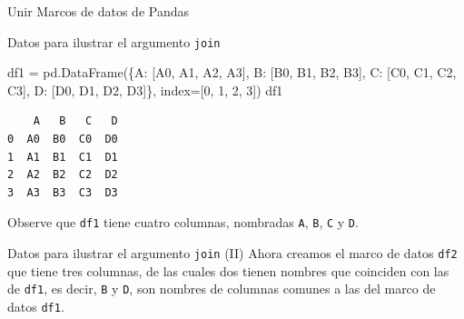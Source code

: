 \documentclass[
  ignorenonframetext,
  aspectratio=169,
  spanish,
]{beamer}
\newenvironment{Shaded}{\begin{snugshade}}{\end{snugshade}}
\newcommand{\DecValTok}[1]{\textcolor[rgb]{0.68,0.00,0.00}{#1}}
\newcommand{\NormalTok}[1]{\textcolor[rgb]{0.00,0.23,0.31}{#1}}
\newcommand{\OperatorTok}[1]{\textcolor[rgb]{0.37,0.37,0.37}{#1}}
\newcommand{\StringTok}[1]{\textcolor[rgb]{0.13,0.47,0.30}{#1}}
\begin{document}
\begin{frame}[fragile]{Unir Marcos de datos de Pandas}
\begin{block}{Datos para ilustrar el argumento \texttt{join}}
\label{datos-para-ilustrar-el-argumento-join}
\begin{Shaded}
\begin{Highlighting}[]
\NormalTok{df1 }\OperatorTok{=}\NormalTok{ pd.DataFrame(\{}\StringTok{\textquotesingle{}A\textquotesingle{}}\NormalTok{: [}\StringTok{\textquotesingle{}A0\textquotesingle{}}\NormalTok{, }\StringTok{\textquotesingle{}A1\textquotesingle{}}\NormalTok{, }\StringTok{\textquotesingle{}A2\textquotesingle{}}\NormalTok{, }\StringTok{\textquotesingle{}A3\textquotesingle{}}\NormalTok{],}
                    \StringTok{\textquotesingle{}B\textquotesingle{}}\NormalTok{: [}\StringTok{\textquotesingle{}B0\textquotesingle{}}\NormalTok{, }\StringTok{\textquotesingle{}B1\textquotesingle{}}\NormalTok{, }\StringTok{\textquotesingle{}B2\textquotesingle{}}\NormalTok{, }\StringTok{\textquotesingle{}B3\textquotesingle{}}\NormalTok{],}
                    \StringTok{\textquotesingle{}C\textquotesingle{}}\NormalTok{: [}\StringTok{\textquotesingle{}C0\textquotesingle{}}\NormalTok{, }\StringTok{\textquotesingle{}C1\textquotesingle{}}\NormalTok{, }\StringTok{\textquotesingle{}C2\textquotesingle{}}\NormalTok{, }\StringTok{\textquotesingle{}C3\textquotesingle{}}\NormalTok{],}
                    \StringTok{\textquotesingle{}D\textquotesingle{}}\NormalTok{: [}\StringTok{\textquotesingle{}D0\textquotesingle{}}\NormalTok{, }\StringTok{\textquotesingle{}D1\textquotesingle{}}\NormalTok{, }\StringTok{\textquotesingle{}D2\textquotesingle{}}\NormalTok{, }\StringTok{\textquotesingle{}D3\textquotesingle{}}\NormalTok{]\},}
\NormalTok{                       index}\OperatorTok{=}\NormalTok{[}\DecValTok{0}\NormalTok{, }\DecValTok{1}\NormalTok{, }\DecValTok{2}\NormalTok{, }\DecValTok{3}\NormalTok{])}
\NormalTok{df1}
\end{Highlighting}
\end{Shaded}

\begin{verbatim}
    A   B   C   D
0  A0  B0  C0  D0
1  A1  B1  C1  D1
2  A2  B2  C2  D2
3  A3  B3  C3  D3
\end{verbatim}

Observe que \texttt{df1} tiene cuatro columnas, nombradas \texttt{A},
\texttt{B}, \texttt{C} y \texttt{D}.
\end{block}

\begin{block}{Datos para ilustrar el argumento \texttt{join} (II)}
\label{datos-para-ilustrar-el-argumento-join-ii}
Ahora creamos el marco de datos \texttt{df2} que tiene tres columnas, de
las cuales dos tienen nombres que coinciden con las de \texttt{df1}, es
decir, \texttt{B} y \texttt{D}, son nombres de columnas comunes a las
del marco de datos \texttt{df1}.


\end{block}
\end{frame}
\end{document}
